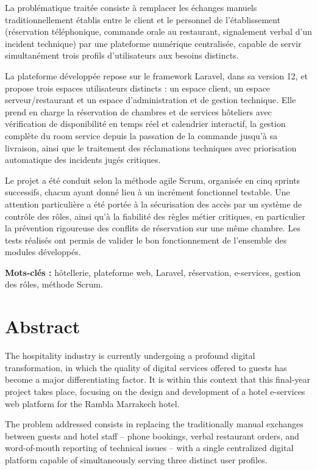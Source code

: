 \documentclass[12pt,a4paper]{report}
\begin{document}
La problématique traitée consiste à remplacer les échanges manuels
traditionnellement établis entre le client et le personnel de
l'établissement (réservation téléphonique, commande orale au restaurant,
signalement verbal d'un incident technique) par une plateforme numérique
centralisée, capable de servir simultanément trois profils d'utilisateurs
aux besoins distincts.

La plateforme développée repose sur le framework Laravel, dans sa version
12, et propose trois espaces utilisateurs distincts : un espace client, un
espace serveur/restaurant et un espace d'administration et de gestion
technique. Elle prend en charge la réservation de chambres et de services
hôteliers avec vérification de disponibilité en temps réel et calendrier
interactif, la gestion complète du room service depuis la passation de la
commande jusqu'à sa livraison, ainsi que le traitement des réclamations
techniques avec priorisation automatique des incidents jugés critiques.

Le projet a été conduit selon la méthode agile Scrum, organisée en cinq
sprints successifs, chacun ayant donné lieu à un incrément fonctionnel
testable. Une attention particulière a été portée à la sécurisation des
accès par un système de contrôle des rôles, ainsi qu'à la fiabilité des
règles métier critiques, en particulier la prévention rigoureuse des
conflits de réservation sur une même chambre. Les tests réalisés ont
permis de valider le bon fonctionnement de l'ensemble des modules
développés.

\vspace{0.5cm}
\noindent\textbf{Mots-clés :} hôtellerie, plateforme web, Laravel, réservation,
e-services, gestion des rôles, méthode Scrum.

\clearpage

\chapter*{Abstract}

The hospitality industry is currently undergoing a profound digital
transformation, in which the quality of digital services offered to guests
has become a major differentiating factor. It is within this context that
this final-year project takes place, focusing on the design and
development of a hotel e-services web platform for the Rambla Marrakech
hotel.

The problem addressed consists in replacing the traditionally manual
exchanges between guests and hotel staff -- phone bookings, verbal
restaurant orders, and word-of-mouth reporting of technical issues -- with
a single centralized digital platform capable of simultaneously serving
three distinct user profiles.
\end{document}
